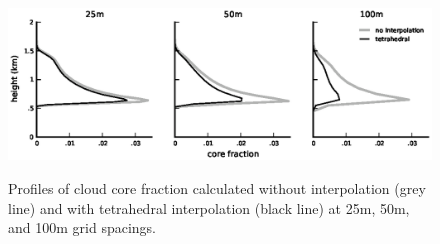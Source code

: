 \documentclass[12pt]{article}
\begin{document}
\begin{figure}[t]
  \noindent\includegraphics[width=39pc,angle=0]{./figures/area_comparison}\\ 
  \caption{Profiles of cloud core fraction calculated without interpolation 
  (grey line) and with tetrahedral interpolation (black line) at 25m, 50m, 
  and 100m grid spacings.
  }\label{fig:area_comparison}
\end{figure}
\end{document}
